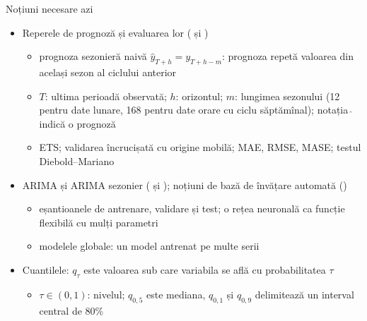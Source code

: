 \begin{frame}{Noțiuni necesare azi}
\itemsize{\footnotesize}
\begin{itemize}
    \item Reperele de prognoză și evaluarea lor ( și )
    \begin{itemize}
        \item prognoza sezonieră naivă $\hat y_{T+h} = y_{T+h-m}$: prognoza repetă valoarea din același sezon al ciclului anterior
        \item $T$: ultima perioadă observată; $h$: orizontul; $m$: lungimea sezonului (12 pentru date lunare, 168 pentru date orare cu ciclu săptămînal); notația $\hat{\ }$ indică o prognoză
        \item ETS; validarea încrucișată cu origine mobilă; MAE, RMSE, MASE; testul Diebold--Mariano
    \end{itemize}
    \item ARIMA și ARIMA sezonier ( și ); noțiuni de bază de învățare automată ()
    \begin{itemize}
        \item eșantioanele de antrenare, validare și test; o rețea neuronală ca funcție flexibilă cu mulți parametri
        \item modelele globale: un model antrenat pe multe serii
    \end{itemize}
    \item Cuantilele: $q_\tau$ este valoarea sub care variabila se află cu probabilitatea $\tau$
    \begin{itemize}
        \item $\tau \in (0, 1)$: nivelul; $q_{0{,}5}$ este mediana, $q_{0{,}1}$ și $q_{0{,}9}$ delimitează un interval central de 80\%
    \end{itemize}
\end{itemize}
\end{frame}


